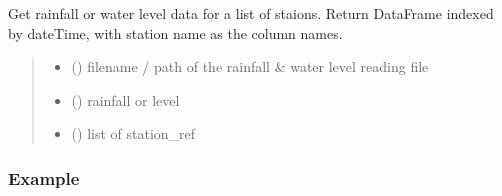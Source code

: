 \documentclass[letterpaper,10pt,english]{sphinxmanual}
\begin{document}
\begin{fulllineitems}
\label{\detokenize{index:flood_tool.get_station_reading}}
\pysigstartsignatures
{}
\pysigstopsignatures
\sphinxAtStartPar
Get rainfall or water level data for a list of staions.
Return DataFrame indexed by dateTime, with station name as the column names.
\begin{quote}\begin{description}
\begin{itemize}
\item {} 
\sphinxAtStartPar
{} () \textendash{} filename / path of the rainfall \& water level reading file

\item {} 
\sphinxAtStartPar
{} () \textendash{} rainfall or level

\item {} 
\sphinxAtStartPar
{} () \textendash{} list of station\_ref

\end{itemize}

\end{description}\end{quote}
\subsubsection*{Example}

\begin{sphinxVerbatim}[commandchars=\\\{\}]
\PYG{p}{[}  \PYG{p}{]}
\end{sphinxVerbatim}

\end{fulllineitems}
\end{document}
